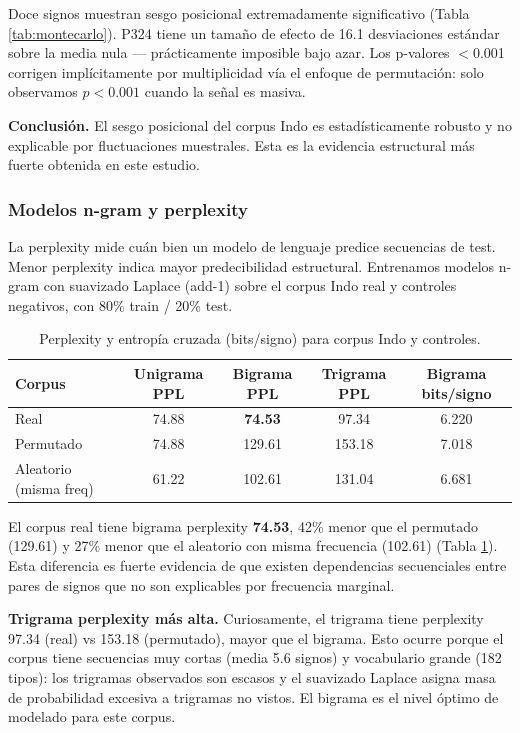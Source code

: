 Doce signos muestran sesgo posicional extremadamente significativo (Tabla \ref{tab:montecarlo}). P324 tiene un tama\~no de efecto de 16.1 desviaciones est\'andar sobre la media nula --- pr\'acticamente imposible bajo azar. Los p-valores $<$0.001 corrigen impl\'icitamente por multiplicidad v\'ia el enfoque de permutaci\'on: solo observamos $p<0.001$ cuando la se\~nal es masiva.

\textbf{Conclusi\'on.} El sesgo posicional del corpus Indo es estad\'isticamente robusto y no explicable por fluctuaciones muestrales. Esta es la evidencia estructural m\'as fuerte obtenida en este estudio.

\subsubsection{Modelos n-gram y perplexity}

La perplexity mide cu\'an bien un modelo de lenguaje predice secuencias de test. Menor perplexity indica mayor predecibilidad estructural. Entrenamos modelos n-gram con suavizado Laplace (add-1) sobre el corpus Indo real y controles negativos, con 80\% train / 20\% test.

\begin{table}[h]
\centering
\caption{Perplexity y entrop\'ia cruzada (bits/signo) para corpus Indo y controles.}
\label{tab:ngram}
\begin{tabular}{lcccc}
\toprule
Corpus & Unigrama PPL & Bigrama PPL & Trigrama PPL & Bigrama bits/signo \\
\midrule
Real & 74.88 & \textbf{74.53} & 97.34 & 6.220 \\
Permutado & 74.88 & 129.61 & 153.18 & 7.018 \\
Aleatorio (misma freq) & 61.22 & 102.61 & 131.04 & 6.681 \\
\bottomrule
\end{tabular}
\end{table}

El corpus real tiene bigrama perplexity \textbf{74.53}, 42\% menor que el permutado (129.61) y 27\% menor que el aleatorio con misma frecuencia (102.61) (Tabla \ref{tab:ngram}). Esta diferencia es fuerte evidencia de que existen dependencias secuenciales entre pares de signos que no son explicables por frecuencia marginal.

\textbf{Trigrama perplexity m\'as alta.} Curiosamente, el trigrama tiene perplexity 97.34 (real) vs 153.18 (permutado), mayor que el bigrama. Esto ocurre porque el corpus tiene secuencias muy cortas (media 5.6 signos) y vocabulario grande (182 tipos): los trigramas observados son escasos y el suavizado Laplace asigna masa de probabilidad excesiva a trigramas no vistos. El bigrama es el nivel \'optimo de modelado para este corpus.

